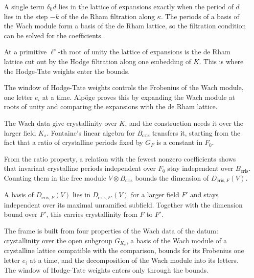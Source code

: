 A single term $\delta_kd$ lies in the lattice of expansions exactly when the
period of $d$ lies in the step $-k$ of the de Rham filtration along $\kappa$.
The periods of a basis of the Wach module form a basis of the de Rham lattice,
so the filtration condition can be solved for the coefficients.

At a primitive $\ell^s$-th root of unity the lattice of expansions is the de
Rham lattice cut out by the Hodge filtration along one embedding of $K$. This
is where the Hodge-Tate weights enter the bounds.

The window of Hodge-Tate weights controls the Frobenius of the Wach module, one
letter $e_i$ at a time. Alpöge proves this by expanding the Wach module at
roots of unity and comparing the expansions with the de Rham lattice.

The Wach data give crystallinity over $K$, and the construction needs it over
the larger field $K_s$. Fontaine's linear algebra for $B_{\mathrm{cris}}$
transfers it, starting from the fact that a ratio of crystalline periods fixed
by $G_F$ is a constant in $F_0$.

From the ratio property, a relation with the fewest nonzero coefficients shows
that invariant crystalline periods independent over $F_0$ stay independent over
$B_{\mathrm{cris}}$. Counting them in the free module
$V\otimes B_{\mathrm{cris}}$ bounds the dimension of $D_{\mathrm{cris},F}(V)$.

A basis of $D_{\mathrm{cris},F}(V)$ lies in $D_{\mathrm{cris},F'}(V)$ for a larger
field $F'$ and stays independent over its maximal unramified subfield. Together
with the dimension bound over $F'$, this carries crystallinity from $F$ to $F'$.

The frame is built from four properties of the Wach data of the datum:
crystallinity over the open subgroup $G_{K_s}$, a basis of the Wach module of a
crystalline lattice compatible with the comparison, bounds for its Frobenius
one letter $e_i$ at a time, and the decomposition of the Wach module into its
letters. The window of Hodge-Tate weights enters only through the bounds.

